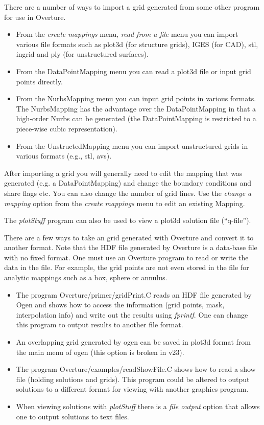 \documentclass[xcolor=rgb,svgnames,dvipsnames]{article}
\begin{document}
There are a number of ways to import a grid generated from some other program for
use in Overture. 
\begin{itemize}
  \item From the {\em create mappings} menu, {\em read from a file} menu you can
        import various file formats such as plot3d (for structure grids), IGES (for
        CAD), stl, ingrid and ply (for unstructured surfaces). 
  \item From the DataPointMapping menu you can read a plot3d file or input grid
      points directly.
  \item From the NurbsMapping menu you can input grid points in various formats.
     The NurbsMapping has the advantage over the DataPointMapping in that a high-order
     Nurbs can be generated (the DataPointMapping is restricted to a piece-wise
     cubic representation).
  \item From the UnstructedMapping menu you can import unstructured grids in various
    formats (e.g., stl, avs). 
\end{itemize}
After importing a grid you will generally need to edit the mapping that was generated
(e.g. a DataPointMapping) and change the boundary conditions and share flags etc.
You can also change the number of grid lines. Use the {\em change a mapping} option
from the {\em create mappings} menu to edit an existing Mapping.

The {\em plotStuff} program can also be used to view a plot3d solution file (``q-file'').


There are a few ways to take an grid generated with Overture and convert it to
another format. Note that the HDF file generated by Overture is a data-base file
with no fixed format. One must use an Overture program to read or write the data
in the file. For example, the grid points are not even stored in the file for
analytic mappings such as a box, sphere or annulus.

\begin{itemize}
  \item The program Overture/primer/gridPrint.C reads an HDF file generated
        by Ogen and shows how to access the information (grid points, mask, interpolation
        info) and write out the results using {\em fprintf}. One can change this
        program to output results to another file format.
  \item An overlapping grid generated by ogen can be saved in plot3d format from
        the main menu of ogen (this option is broken in v23).
  \item The program Overture/examples/readShowFile.C shows how to read a show file
     (holding solutions and grids). This program could be altered to output solutions
     to a different format for viewing with another graphics program.
   \item When viewing solutions with {\em plotStuff} there is a {\em file output} option
         that allows one to output solutions to text files.
\end{itemize}
\end{document}
